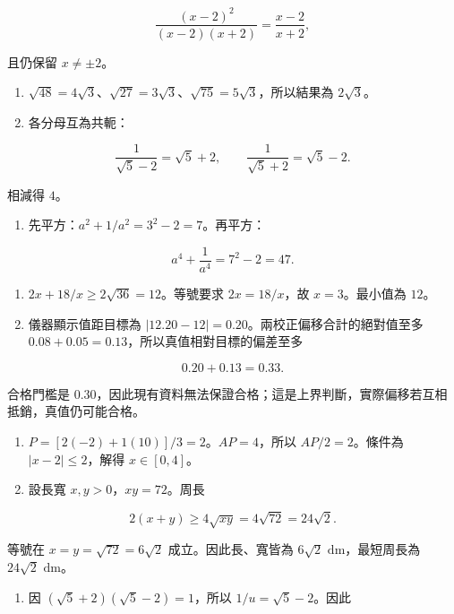 \documentclass[11pt,a4paper]{article}
\providecommand{\tightlist}{%
  \setlength{\itemsep}{0pt}\setlength{\parskip}{0pt}}
\begin{document}
\[
\frac{(x-2)^2}{(x-2)(x+2)}=\boxed{\frac{x-2}{x+2}},
\]

且仍保留 \(\boxed{x\ne\pm2}\)。

\begin{enumerate}
\def\labelenumi{\arabic{enumi}.}
\setcounter{enumi}{8}
\item
  \(\sqrt{48}=4\sqrt3\)、\(\sqrt{27}=3\sqrt3\)、\(\sqrt{75}=5\sqrt3\)，所以結果為 \(\boxed{2\sqrt3}\)。
\item
  各分母互為共軛：
\end{enumerate}

\[
\frac1{\sqrt5-2}=\sqrt5+2,
\qquad
\frac1{\sqrt5+2}=\sqrt5-2.
\]

相減得 \(\boxed4\)。

\begin{enumerate}
\def\labelenumi{\arabic{enumi}.}
\setcounter{enumi}{10}
\tightlist
\item
  先平方：\(a^2+1/a^2=3^2-2=7\)。再平方：
\end{enumerate}

\[
a^4+\frac1{a^4}=7^2-2=\boxed{47}.
\]

\begin{enumerate}
\def\labelenumi{\arabic{enumi}.}
\setcounter{enumi}{11}
\item
  \(2x+18/x\ge2\sqrt{36}=12\)。等號要求 \(2x=18/x\)，故 \(x=3\)。最小值為 \(\boxed{12}\)。
\item
  儀器顯示值距目標為 \(|12.20-12|=0.20\)。兩校正偏移合計的絕對值至多 \(0.08+0.05=0.13\)，所以真值相對目標的偏差至多
\end{enumerate}

\[
0.20+0.13=\boxed{0.33}.
\]

合格門檻是 \(0.30\)，因此現有資料無法保證合格；這是上界判斷，實際偏移若互相抵銷，真值仍可能合格。

\begin{enumerate}
\def\labelenumi{\arabic{enumi}.}
\setcounter{enumi}{13}
\item
  \(P=[2(-2)+1(10)]/3=2\)。\(AP=4\)，所以 \(AP/2=2\)。條件為 \(|x-2|\le2\)，解得 \(\boxed{x\in[0,4]}\)。
\item
  設長寬 \(x,y>0\)，\(xy=72\)。周長
\end{enumerate}

\[
2(x+y)\ge4\sqrt{xy}=4\sqrt{72}=24\sqrt2.
\]

等號在 \(x=y=\sqrt{72}=6\sqrt2\) 成立。因此長、寬皆為 \(\boxed{6\sqrt2\text{ dm}}\)，最短周長為 \(\boxed{24\sqrt2\text{ dm}}\)。

\begin{enumerate}
\def\labelenumi{\arabic{enumi}.}
\setcounter{enumi}{15}
\tightlist
\item
  因 \((\sqrt5+2)(\sqrt5-2)=1\)，所以 \(1/u=\sqrt5-2\)。因此
\end{enumerate}
\end{document}
